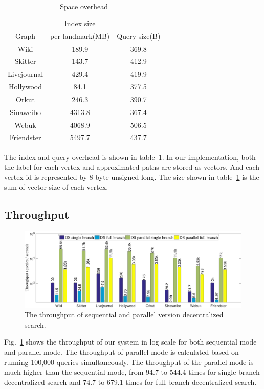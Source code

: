\begin{table}
		\caption{Space overhead}
		\vspace{2 mm}
    \label{table:ioh}
    \centering
    \begin{tabular}{c|cc} \hline
				&Index size&\\
				Graph&per landmark(MB)&Query size(B)\\ \hline
				Wiki&189.9&369.8 \\ 
				Skitter&143.7&412.9 \\ 
				Livejournal&429.4&419.9 \\ 
				Hollywood&84.1&377.5 \\ 
				Orkut&246.3&390.7 \\ 
				Sinaweibo&4313.8&367.4 \\ 
				Webuk&4068.9&506.5 \\ 
				Friendster&5497.7&437.7 \\ \hline
    \end{tabular}
\end{table}

The index and query overhead is shown in table~\ref{table:ioh}. In our implementation, both the label for each vertex and approximated paths are stored as vectors. And each vertex id is represented by 8-byte unsigned long. The size shown in table~\ref{table:ioh} is the sum of vector size of each vertex. 

\subsection{Throughput}
\label{eval_throughput}

\begin{figure}[ht]
    \centering
    \includegraphics[width=0.95\linewidth]{./figures/throughput.pdf}
    \caption{The throughput of sequential and parallel version decentralized search.}
    \label{fig:throughput}
\end{figure}

Fig.~\ref{fig:throughput} shows the throughput of our system in log scale for both sequential mode and parallel mode. The throughput of parallel mode is calculated based on running 100,000 queries simultaneously. The throughput of the parallel mode is much higher than the sequential mode, from 94.7 to 544.4 times for single branch decentralized search and 74.7 to 679.1 times for full branch decentralized search. 

